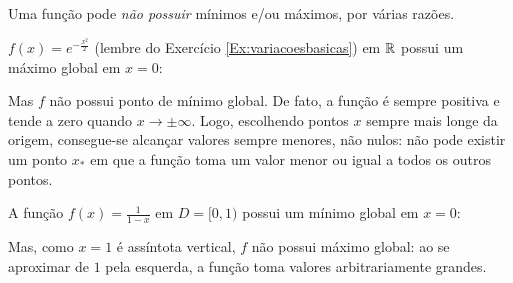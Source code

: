 Uma função pode \emph{não possuir} mínimos e/ou máximos, por várias razões.

\begin{ex}\label{Ex:naoexistenciaextremos1}
$f(x)=e^{-\tfrac{x^2}{2}}$ (lembre do Exercício
\ref{Ex:variacoesbasicas}) em $\mathbb{R}$  possui um máximo global em $x=0$:
\begin{center}
\begin{bmlimage}\end{bmlimage}
\end{center}
Mas $f$ não possui ponto de mínimo global.
De fato, a função é sempre positiva e tende a zero quando $x\to\pm
\infty$. Logo, escolhendo pontos $x$ sempre mais longe da origem,
consegue-se alcançar valores sempre menores, não nulos: não 
pode existir um ponto $x_*$ em que a função toma um
valor menor ou igual a todos os outros pontos.
\end{ex}

\begin{ex}\label{Ex:naoexistenciaextremos2}
A função $f(x)=\frac{1}{1-x}$ em $D=[0,1)$ possui um mínimo global em
$x=0$:
\begin{center}
\begin{bmlimage}\end{bmlimage}
\end{center}
Mas, como $x=1$ é assíntota vertical, $f$ não possui máximo
global: ao se aproximar de $1$ pela esquerda, a função toma valores
arbitrariamente grandes.
\end{ex}

